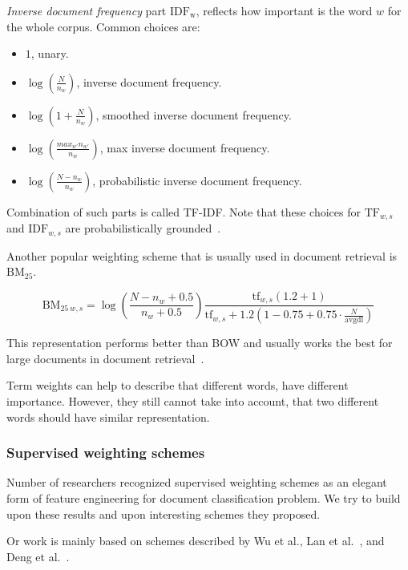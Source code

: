     \emph{Inverse document frequency} part $\mathrm{IDF_w}$, reflects how important is the word $w$ for the whole corpus.
    Common choices are:
    \begin{itemize}
        \item $1$, unary.
        \item $\log \left(\frac{N}{n_w} \right)$, inverse document frequency.
        \item $\log \left( 1+\frac{N}{n_w} \right)$, smoothed inverse document frequency.
        \item $\log \left( \frac{max_{w'} n_{w'}}{n_w} \right)$, max inverse document frequency.
        \item $\log \left(\frac{N-n_w}{n_w} \right)$, probabilistic inverse document frequency.
    \end{itemize}

    Combination of such parts is called TF-IDF.
    Note that these choices for $\mathrm{TF}_{w,s}$ and $\mathrm{IDF}_{w,s}$ are probabilistically grounded~\cite{aizawa2003information}. %
    
    Another popular weighting scheme that is usually used in document retrieval is $\mathrm{BM_{25}}$. 
    
    $$\mathrm{BM}_{25~w,s} = \log \left(\frac{N-n_w+0.5}{n_w + 0.5}\right)    \frac{\mathrm{tf}_{w,s} (1.2 + 1)}{\mathrm{tf}_{w,s} + 1.2  \left(1 - 0.75 + 0.75 \cdot \frac{N}{\text{avgdl}}\right)}$$
    
    This representation performs better than BOW and usually works the best for large documents in document retrieval~\cite{li2014semantic}.
    
    Term weights can help to describe that different words, have different importance.
    However, they still cannot take into account, that two different words should have similar representation.
    
    \subsubsection{Supervised weighting schemes} \label{sec:supervised:weights}
    Number of researchers recognized supervised weighting schemes as an elegant form of feature engineering for document classification problem.
    We try to build upon these results and upon interesting schemes they proposed.
    
    Or work is mainly based on schemes described by Wu et al.\cite{wu2017balancing}, %
    Lan et al.~\cite{lan2009supervised}, %
    and Deng et al.~\cite{deng2014study}. %
    
